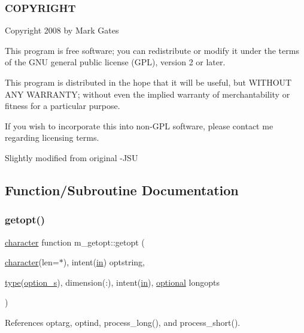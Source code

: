 \subsubsection*{C\+O\+P\+Y\+R\+I\+G\+HT}

Copyright 2008 by Mark Gates

This program is free software; you can redistribute or modify it under the terms of the G\+NU general public license (G\+PL), version 2 or later.

This program is distributed in the hope that it will be useful, but W\+I\+T\+H\+O\+UT A\+NY W\+A\+R\+R\+A\+N\+TY; without even the implied warranty of merchantability or fitness for a particular purpose.

If you wish to incorporate this into non-\/\+G\+PL software, please contact me regarding licensing terms.

Slightly modified from original -\/\+J\+SU 

\subsection{Function/\+Subroutine Documentation}
\mbox{\label{namespacem__getopt_a00e4c1d7d61539e0bdf63a6ee13284d2}} 
\subsubsection{\texorpdfstring{getopt()}{getopt()}}
{\footnotesize\ttfamily \hyperlink{option__stopwatch_83_8txt_abd4b21fbbd175834027b5224bfe97e66}{character} function m\+\_\+getopt\+::getopt (\begin{DoxyParamCaption}\item[{\hyperlink{option__stopwatch_83_8txt_abd4b21fbbd175834027b5224bfe97e66}{character}(len=$\ast$), intent(\hyperlink{M__journal_83_8txt_afce72651d1eed785a2132bee863b2f38}{in})}]{optstring,  }\item[{\hyperlink{stop__watch_83_8txt_a70f0ead91c32e25323c03265aa302c1c}{type}(\hyperlink{structm__getopt_1_1option__s}{option\+\_\+s}), dimension(\+:), intent(\hyperlink{M__journal_83_8txt_afce72651d1eed785a2132bee863b2f38}{in}), \hyperlink{option__stopwatch_83_8txt_aa4ece75e7acf58a4843f70fe18c3ade5}{optional}}]{longopts }\end{DoxyParamCaption})}



References optarg, optind, process\+\_\+long(), and process\+\_\+short().

